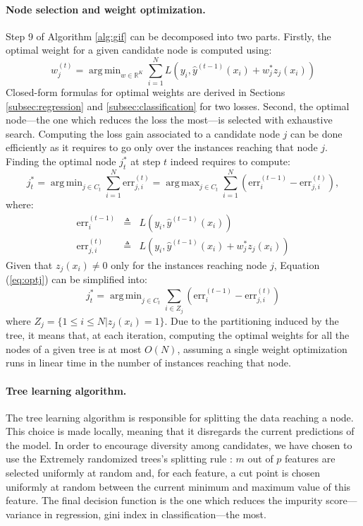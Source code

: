 \documentclass{article}
\DeclareMathOperator*{\argmin}{arg\,min}
\DeclareMathOperator*{\argmax}{arg\,max}
\begin{document}
\paragraph{Node selection and weight optimization.}
Step 9 of Algorithm \ref{alg:gif} can be decomposed into two parts. Firstly,
the optimal weight for a given candidate node is computed using:
\begin{equation}\label{eq:nodeSel}
  w^{(t)}_j = \argmin_{w\in \mathbb{R}^K} \sum_{i=1}^N L\left(y_i, 
  \hat{y}^{(t-1)}(x_i) + w_j^* z_j(x_i)  \right)
\end{equation}
Closed-form formulas for optimal weights are derived in Sections
\ref{subsec:regression} and \ref{subsec:classification} for two losses. Second,
the optimal node---the one which reduces the loss the most---is selected with
exhaustive search. Computing the loss gain associated to a candidate node $j$
can be done efficiently as it requires to go only over the instances reaching
that node $j$. Finding the optimal node $j_t^*$ at step $t$ indeed requires to compute:
\begin{equation}\label{eq:optj}
  j_t^* = \argmin_{j \in C_t} \sum_{i=1}^N \text{err}_{j,i}^{(t)} = \argmax_{j \in C_t} 
  \sum_{i=1}^N (\text{err}^{(t-1)}_i - \text{err}_{j,i}^{(t)}),
\end{equation}
where:
\begin{eqnarray*}%
\text{err}^{(t-1)}_i & \triangleq &  L \left(y_i, 
\hat{y}^{(t-1)}(x_i)  \right) \\
\text{err}_{j,i}^{(t)} & \triangleq&  L \left(y_i, 
\hat{y}^{(t-1)}(x_i) + w_j^* z_j(x_i)  \right)
\end{eqnarray*}
Given that $z_j(x_i)\neq 0$ only for the instances reaching node $j$, Equation (\ref{eq:optj}) can be simplified into:
\begin{equation}\label{eq:optj2}
  j_t^* = \argmin_{j \in C_t} \sum_{i\in Z_j} (\text{err}^{(t-1)}_i - \text{err}_{j,i}^{(t)})
\end{equation}
where $Z_j = \{1 \leq i \leq N | z_j (x_i)=1 \}$. Due to the partitioning
induced by the tree, it means that, at each iteration, computing the optimal
weights for all the nodes of a given tree is at most $O(N)$, assuming a single
weight optimization runs in linear time in the number of instances reaching
that node.

\paragraph{Tree learning algorithm.}
The tree learning algorithm is responsible for splitting the data reaching a 
node. This choice is made locally, meaning that it disregards the current 
predictions of the model. In order to encourage diversity among candidates, we 
have chosen to use the Extremely randomized trees's splitting rule 
\cite{extratrees}: $m$ out of $p$ features are selected uniformly at random 
and, for each feature, a cut point is chosen uniformly at random between the 
current minimum and maximum value of this feature. The final decision function 
is the one which reduces the impurity score---variance in regression, gini 
index in classification---the most.
\end{document}
